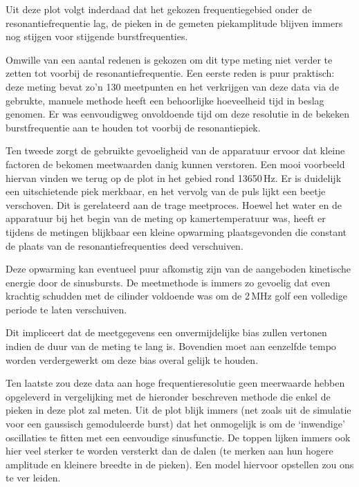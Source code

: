 Uit deze plot volgt inderdaad dat het gekozen frequentiegebied onder de 
resonantiefrequentie lag, de pieken in de gemeten piekamplitude blijven 
immers nog stijgen voor stijgende burstfrequenties.

Omwille van een aantal redenen is gekozen om dit type meting niet verder te 
zetten tot voorbij de resonantiefrequentie. Een eerste reden is puur 
praktisch: deze meting bevat zo'n 130 meetpunten en het verkrijgen van deze 
data via de gebrukte, manuele methode heeft een behoorlijke hoeveelheid 
tijd in beslag genomen. Er was eenvoudigweg onvoldoende tijd om deze 
resolutie in de bekeken burstfrequentie aan te houden tot voorbij de 
resonantiepiek.


Ten tweede zorgt de gebruikte gevoeligheid van de apparatuur ervoor dat 
kleine factoren de bekomen meetwaarden danig kunnen verstoren. Een mooi 
voorbeeld hiervan vinden we terug op de plot in het gebied rond 13650\,Hz.  
Er is duidelijk een uitschietende piek merkbaar, en het vervolg van de puls 
lijkt een beetje verschoven. Dit is gerelateerd aan de trage meetproces.  
Hoewel het water en de apparatuur bij het begin van de meting op 
kamertemperatuur was, heeft er tijdens de metingen blijkbaar een kleine 
opwarming plaatsgevonden die constant de plaats van de 
resonantiefrequenties deed verschuiven.

Deze opwarming kan eventueel puur afkomstig zijn van de aangeboden 
kinetische energie door de sinusbursts. De meetmethode is immers zo 
gevoelig dat even krachtig schudden met de cilinder voldoende was om de 
2\,MHz golf een volledige periode te laten verschuiven.

Dit impliceert dat de meetgegevens een onvermijdelijke bias zullen vertonen 
indien de duur van de meting te lang is. Bovendien moet aan eenzelfde tempo 
worden verdergewerkt om deze bias overal gelijk te houden.


Ten laatste zou deze data aan hoge frequentieresolutie geen meerwaarde 
hebben opgeleverd in vergelijking met de hieronder beschreven methode die 
enkel de pieken in deze plot zal meten.  Uit de plot blijk immers (net 
zoals uit de simulatie voor een gaussisch gemoduleerde burst) dat het 
onmogelijk is om de `inwendige' oscillaties te fitten met een eenvoudige 
sinusfunctie.  De toppen lijken immers ook hier veel sterker te worden 
versterkt dan de dalen (te merken aan hun hogere amplitude en kleinere 
breedte in de pieken). Een model hiervoor opstellen zou ons te ver leiden.



